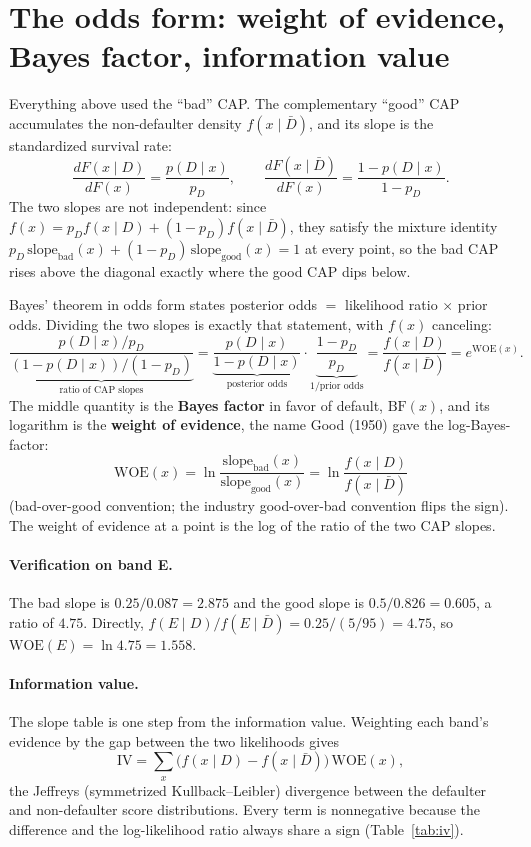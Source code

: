 \documentclass[12pt]{article}
\newcommand{\pD}{p_D}
\newcommand{\PDx}{p(D \mid x)}
\newcommand{\slope}{\mathrm{slope}}
\newcommand{\WOE}{\mathrm{WOE}}
\newcommand{\IV}{\mathrm{IV}}
\begin{document}
\section{The odds form: weight of evidence, Bayes factor, information value}\label{sec:woe}

Everything above used the ``bad'' CAP. The complementary ``good'' CAP accumulates the non-defaulter
density $f(x\mid\bar D)$, and its slope is the standardized survival rate:
\begin{equation}
\frac{dF(x\mid D)}{dF(x)}=\frac{\PDx}{\pD},
\qquad
\frac{dF(x\mid\bar D)}{dF(x)}=\frac{1-\PDx}{1-\pD}.
\end{equation}
The two slopes are not independent: since $f(x)=\pD f(x\mid D)+(1-\pD)f(x\mid\bar D)$, they
satisfy the mixture identity $\pD\,\slope_{\text{bad}}(x)+(1-\pD)\,\slope_{\text{good}}(x)=1$ at
every point, so the bad CAP rises above the diagonal exactly where the good CAP dips below.

Bayes' theorem in odds form states posterior odds $=$ likelihood ratio $\times$ prior odds.
Dividing the two slopes is exactly that statement, with $f(x)$ canceling:
\begin{equation}\label{eq:woe}
\underbrace{\frac{\PDx/\pD}{(1-\PDx)/(1-\pD)}}_{\text{ratio of CAP slopes}}
=\underbrace{\frac{\PDx}{1-\PDx}}_{\text{posterior odds}}\cdot
\underbrace{\frac{1-\pD}{\pD}}_{1/\text{prior odds}}
=\frac{f(x\mid D)}{f(x\mid\bar D)}
=e^{\WOE(x)} .
\end{equation}
The middle quantity is the \textbf{Bayes factor} in favor of default, $\mathrm{BF}(x)$, and its
logarithm is the \textbf{weight of evidence}, the name Good (1950) gave the log-Bayes-factor:
\begin{equation}\label{eq:woe-def}
\boxed{\;\WOE(x)=\ln\frac{\slope_{\text{bad}}(x)}{\slope_{\text{good}}(x)}
=\ln\frac{f(x\mid D)}{f(x\mid\bar D)}\;}
\end{equation}
(bad-over-good convention; the industry good-over-bad convention flips the sign). The weight
of evidence at a point is the log of the ratio of the two CAP slopes.

\paragraph{Verification on band E.} The bad slope is $0.25/0.087=2.875$ and the good slope is
$0.5/0.826=0.605$, a ratio of $4.75$. Directly,
$f(E\mid D)/f(E\mid\bar D)=0.25/(5/95)=4.75$, so $\WOE(E)=\ln 4.75=1.558$.

\paragraph{Information value.} The slope table is one step from the information value. Weighting
each band's evidence by the gap between the two likelihoods gives
\begin{equation}\label{eq:iv}
\IV=\sum_x \bigl(f(x\mid D)-f(x\mid\bar D)\bigr)\,\WOE(x),
\end{equation}
the Jeffreys (symmetrized Kullback--Leibler) divergence between the defaulter and non-defaulter
score distributions. Every term is nonnegative because the difference and the log-likelihood
ratio always share a sign (Table~\ref{tab:iv}).
\end{document}
